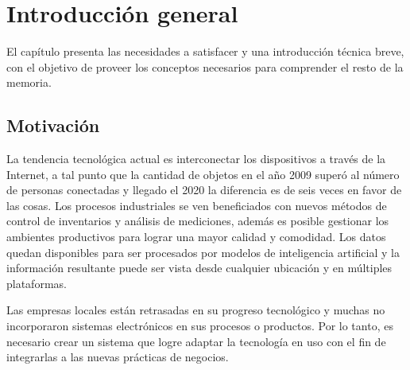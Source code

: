 
\chapter{Introducción general} %

\label{Chapter1} %
\label{IntroGeneral}


\newcommand{\keyword}[1]{\textbf{#1}}
\newcommand{\tabhead}[1]{\textbf{#1}}
\newcommand{\code}[1]{\texttt{#1}}
\newcommand{\file}[1]{\texttt{\bfseries#1}}
\newcommand{\option}[1]{\texttt{\itshape#1}}
\newcommand{\grados}{$^{\circ}$}



El capítulo presenta las necesidades a satisfacer y una introducción técnica breve, con el objetivo de proveer los conceptos necesarios para comprender el resto de la memoria.

\section{Motivación}
\label{ch1Motivacion}

La tendencia tecnológica actual es interconectar los dispositivos a través de la Internet, a tal punto que la cantidad de objetos en el año 2009 superó al número de personas conectadas y llegado el 2020 la diferencia es de seis veces en favor de las cosas. \citep{ARTICLE:DaveEvans}
Los procesos industriales se ven beneficiados con nuevos métodos de control de inventarios y análisis de mediciones, además es posible gestionar los ambientes productivos para lograr una mayor calidad y comodidad.
Los datos quedan disponibles para ser procesados por modelos de inteligencia artificial y la información resultante puede ser vista desde cualquier ubicación y en múltiples plataformas. 

Las empresas locales están retrasadas en su progreso tecnológico y muchas no incorporaron sistemas electrónicos en sus procesos o productos.
Por lo tanto, es necesario crear un sistema que logre adaptar la tecnología en uso con el fin de integrarlas a las nuevas prácticas de negocios.


